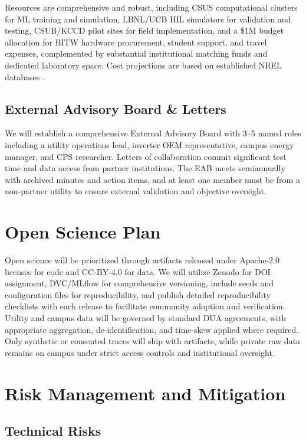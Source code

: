 \documentclass[12pt]{article}
\begin{document}
Resources are comprehensive and robust, including CSUS computational clusters for ML training and simulation, LBNL/UCB HIL simulators for validation and testing, CSUB/KCCD pilot sites for field implementation, and a \$1M budget allocation for BITW hardware procurement, student support, and travel expenses, complemented by substantial institutional matching funds and dedicated laboratory space. Cost projections are based on established NREL databases \cite{nrel2021}.

\subsection{External Advisory Board \& Letters}

We will establish a comprehensive External Advisory Board with 3–5 named roles including a utility operations lead, inverter OEM representative, campus energy manager, and CPS researcher. Letters of collaboration commit significant test time and data access from partner institutions. The EAB meets semiannually with archived minutes and action items, and at least one member must be from a non-partner utility to ensure external validation and objective oversight.

\section{Open Science Plan}

Open science will be prioritized through artifacts released under Apache-2.0 licenses for code and CC-BY-4.0 for data. We will utilize Zenodo for DOI assignment, DVC/MLflow for comprehensive versioning, include seeds and configuration files for reproducibility, and publish detailed reproducibility checklists with each release to facilitate community adoption and verification. Utility and campus data will be governed by standard DUA agreements, with appropriate aggregation, de-identification, and time-skew applied where required. Only synthetic or consented traces will ship with artifacts, while private raw data remains on campus under strict access controls and institutional oversight.

\section{Risk Management and Mitigation}

\subsection{Technical Risks}
\end{document}
